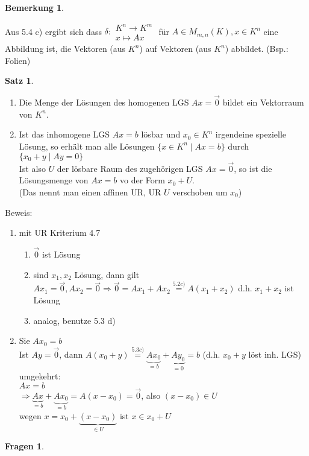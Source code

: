 \documentclass[a4paper,11pt]{article}
\newtheorem{satz}[definition]{Satz}
\newtheorem{bem}[definition]{Bemerkung}
\newtheorem{quest}[definition]{Fragen}
\begin{document}
\begin{bem}
\end{bem}
Aus 5.4 c) ergibt sich dass $\delta\colon\substack{K^n\rightarrow K^m\\x\mapsto Ax}$ für $A\in M_{m,n}(K), x\in K^n$ eine Abbildung ist, die Vektoren (aus $K^n$) auf Vektoren (aus $K^n$) abbildet. (Bsp.: Folien)
\begin{satz}
\end{satz}
\begin{enumerate}[label=\alph*)]
\item Die Menge der Lösungen des homogenen LGS $Ax=\overset{\rightarrow}{0}$ bildet ein Vektorraum von $K^n$.
\item Ist das inhomogene LGS $Ax=b$ lösbar und $x_0\in K^n$ irgendeine spezielle Lösung, so erhält man alle Lösungen $\{x\in K^n\mid Ax=b\}$ durch $\{x_0+y\mid Ay=0\}$ \\
Ist also $U$ der lösbare Raum des zugehörigen LGS $Ax=\overset{\rightarrow}{0}$, so ist die Lösungsmenge von $Ax=b$ vo der Form $x_0+U$. \\
(Das nennt man einen affinen UR, UR $U$ verschoben um $x_0$)
\end{enumerate}
\newpage
Beweis:
\begin{enumerate}[label=\alph*)]
\item mit UR Kriterium 4.7
\begin{enumerate}[label=(\arabic*)]
\item $\overset{\rightarrow}{0}$ ist Lösung
\item sind $x_1, x_2$ Lösung, dann gilt $Ax_1=\overset{\rightarrow}{0}, Ax_2=\overset{\rightarrow}{0}\Rightarrow\overset{\rightarrow}{0}=Ax_1+Ax_2\overset{5.2c)}{=}A(x_1+x_2)$ d.h. $x_1+x_2$ ist Lösung
\item analog, benutze 5.3 d)
\end{enumerate}
\item Sie $Ax_0=b$ \\
Ist $Ay=\overset{\rightarrow}{0}$, dann $A(x_0+y)\overset{5.3c)}{=}\underbrace{Ax_0}_{=b}+\underbrace{Ay_0}_{=0}=b$ (d.h. $x_0+y$ löst inh. LGS) \\
umgekehrt: \\
$Ax=b$ \\
$\Rightarrow\underbrace{Ax}_{=b}+\underbrace{Ax_0}_{=b}=A(x-x_0)=\overset{\rightarrow}{0}$, also $(x-x_0)\in U$ \\
wegen $x=x_0+\underbrace{(x-x_0)}_{\in U}$ ist $x\in x_0+U$
\end{enumerate}
\begin{quest}
\end{quest}
\end{document}
